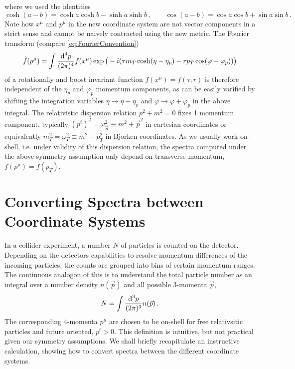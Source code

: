 where we used the identities
\begin{equation}
    \cosh(a-b)=\cosh a\cosh b-\sinh a\sinh b\,,\qquad\cos(a-b)=\cos a\cos b+\sin a\sin b\,.
\end{equation}
Note how $x^\mu$ and $p^\mu$ in the new coordinate system are not vector components in a strict sense and cannot be naively contracted using the new metric. The Fourier transform (compare \eqref{eq:FourierConvention})
\begin{equation}
    \tilde{f}(p^\mu)=\int\frac{\text{d}^4p}{(2\pi)^4}f(x^\mu)\exp\big(-{i}(\tau m_T\cosh(\eta-\eta_p)-rp_T\cos(\varphi-\varphi_p))\big)
\end{equation}
of a rotationally and boost invariant function ${f(x^\mu)=f(\tau,r)}$ is therefore independent of the $\eta_p$ and $\varphi_p$ momentum components, as can be easily varified by shifting the integration variables ${\eta\to\eta-\eta_p}$ and ${\varphi\to\varphi+\varphi_p}$ in the above integral. The relativistic dispersion relation ${p^2+m^2=0}$ fixes 1 momentum component, typically ${(p^t)^2=\omega_{\vec{p}}^2\equiv m^2+\vec{p}^2}$ in cartesian coordinates or equivalently ${m_T^2=\omega_T^2\equiv m^2+p_T^2}$ in Bjorken coordinates. As we usually work on-shell, i.e. under validity of this dispersion relation, the spectra computed under the above symmetry assumption only depend on transverse momentum, ${\tilde{f}(p^\mu)=\tilde{f}(p_T)}$.



\section{Converting Spectra between Coordinate Systems}
\label{sec:SpectraCoordinateSystem}

In a collider experiment, a number $N$ of particles is counted on the detector. Depending on the detectors capabilities to resolve momentum differences of the incoming particles, the counts are grouped into bins of certain momentum ranges. The continuous analogon of this is to understand the total particle number as an integral over a number density $n(\vec{p})$ and all possible 3-momenta $\vec{p}$,
\begin{equation}
    N=\int\frac{\text{d}^3p}{(2\pi)^3}n(\vec{p})\,.
    \label{eq:NumberDensity_Cartesian}
\end{equation}
The corresponding 4-momenta $p^\mu$ are chosen to be on-shell for free relativsitic particles and future oriented, $p^t>0$. This definition is intuitive, but not practical given our symmetry assumptions. We shall briefly recapitulate an instructive calculation, showing how to convert spectra between the different coordinate systems.


